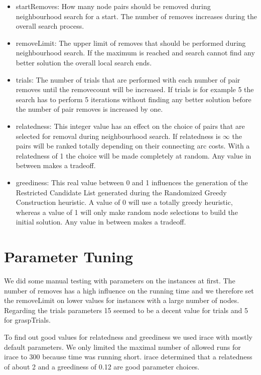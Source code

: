 \documentclass[a4paper]{scrartcl}
\begin{document}
\begin{itemize}
  \item startRemoves: How many node pairs should be removed during neighbourhood search for a start. The number of removes increases during the overall search process.
  \item removeLimit: The upper limit of removes that should be performed during neighbourhood search. If the maximum is reached and search cannot find any better solution the overall local search ends.

  \item trials: The number of trials that are performed with each number of pair removes until the removecount will be increased. If trials is for example 5 the search has to perform 5 iterations without finding any better solution before the number of pair removes is increased by one.

  \item relatedness: This integer value has an effect on the choice of pairs that are selected for removal during neighbourhood search. If relatedness is $\infty$ the pairs will be ranked totally depending on their connecting arc costs. With a relatedness of 1 the choice will be made completely at random. Any value in between makes a tradeoff.

  \item greediness: This real value between 0 and 1 influences the generation of the Restricted Candidate List generated during the Randomized Greedy Construction heuristic. A value of 0 will use a totally greedy heuristic, whereas a value of 1 will only make random node selections to build the initial solution. Any value in between makes a tradeoff.
\end{itemize}

\section{Parameter Tuning}
We did some manual testing with parameters on the instances at first. The number of removes has a high influence on the running time and we therefore set the removeLimit on lower values for instances with a large number of nodes. Regarding the trials parameters 15 seemed to be a decent value for trials and 5 for graspTrials.

To find out good values for relatedness and greediness we used irace \cite{lopez2011irace} with mostly default parameters. We only limited the maximal number of allowed runs for irace to 300 because time was running short. irace determined that a relatedness of about 2 and a greediness of 0.12 are good parameter choices.
\end{document}
